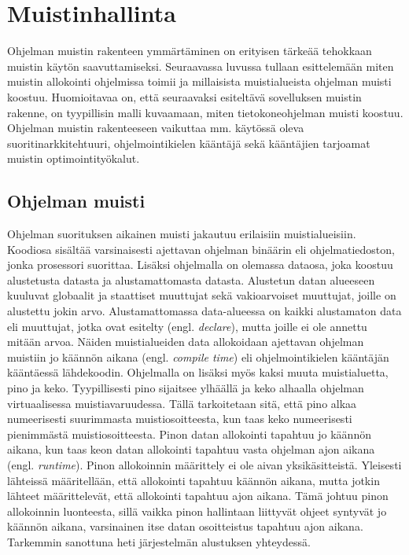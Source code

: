 \chapter{Muistinhallinta} \label{Toinen luku}

Ohjelman muistin rakenteen ymmärtäminen on erityisen tärkeää tehokkaan muistin käytön saavuttamiseksi. Seuraavassa luvussa tullaan esittelemään miten muistin allokointi ohjelmissa toimii
ja millaisista muistialueista ohjelman muisti koostuu. Huomioitavaa on, että seuraavaksi esiteltävä sovelluksen muistin rakenne, on tyypillisin malli kuvaamaan, miten tietokoneohjelman muisti koostuu. Ohjelman muistin rakenteeseen vaikuttaa mm. käytössä oleva suoritinarkkitehtuuri, ohjelmointikielen kääntäjä sekä kääntäjien tarjoamat muistin optimointityökalut.

\section{Ohjelman muisti}

Ohjelman suorituksen aikainen muisti jakautuu erilaisiin muistialueisiin. Koodiosa sisältää varsinaisesti ajettavan ohjelman binäärin eli ohjelmatiedoston, jonka prosessori suorittaa. Lisäksi ohjelmalla on olemassa dataosa, joka koostuu alustetusta datasta ja alustamattomasta datasta. Alustetun datan alueeseen kuuluvat globaalit ja staattiset muuttujat sekä vakioarvoiset muuttujat, joille on alustettu jokin arvo. Alustamattomassa data-alueessa on kaikki alustamaton data eli muuttujat, jotka ovat esitelty (engl. \textit{declare}), mutta joille ei ole annettu mitään arvoa. Näiden muistialueiden data allokoidaan ajettavan ohjelman muistiin jo käännön aikana (engl. \textit{compile time}) eli ohjelmointikielen kääntäjän kääntäessä lähdekoodin. Ohjelmalla on lisäksi myös kaksi muuta muistialuetta, pino ja keko. Tyypillisesti pino sijaitsee ylhäällä ja keko alhaalla ohjelman virtuaalisessa muistiavaruudessa.\cite{mmic2010} Tällä tarkoitetaan sitä, että pino alkaa numeerisesti suurimmasta muistiosoitteesta, kun taas keko numeerisesti pienimmästä muistiosoitteesta. Pinon datan allokointi tapahtuu jo käännön aikana, kun taas keon datan allokointi tapahtuu vasta ohjelman ajon aikana (engl. \textit{runtime})\cite{ddm2015book}. Pinon allokoinnin määrittely ei ole aivan yksikäsitteistä. Yleisesti lähteissä määritellään, että allokointi tapahtuu käännön aikana, mutta jotkin lähteet määrittelevät, että allokointi tapahtuu ajon aikana. Tämä johtuu pinon allokoinnin luonteesta, sillä vaikka pinon hallintaan liittyvät ohjeet syntyvät jo käännön aikana, varsinainen itse datan osoitteistus tapahtuu ajon aikana. Tarkemmin sanottuna heti järjestelmän alustuksen yhteydessä.

